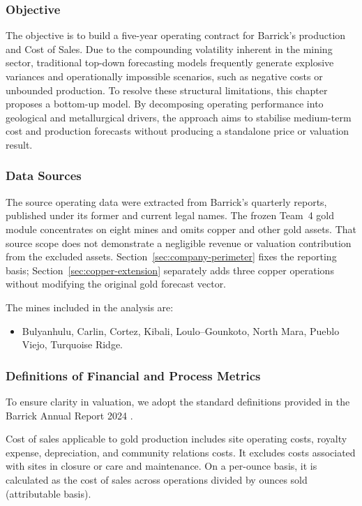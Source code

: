 \subsubsection{Objective}
The objective is to build a five-year operating contract for Barrick's production and Cost of Sales. Due to the compounding volatility inherent in the mining sector, traditional top-down forecasting models frequently generate explosive variances and operationally impossible scenarios, such as negative costs or unbounded production. To resolve these structural limitations, this chapter proposes a bottom-up model. By decomposing operating performance into geological and metallurgical drivers, the approach aims to stabilise medium-term cost and production forecasts without producing a standalone price or valuation result.
\subsubsection{Data Sources}
The source operating data were extracted from Barrick's quarterly reports,
published under its former and current legal names. The frozen Team~4 gold
module concentrates on eight mines and omits copper and other gold assets.
That source scope does not demonstrate a negligible revenue or valuation
contribution from the excluded assets. Section~\ref{sec:company-perimeter}
fixes the reporting basis; Section~\ref{sec:copper-extension} separately adds
three copper operations without modifying the original gold forecast vector.

The mines included in the analysis are:
\begin{itemize}
  \item Bulyanhulu, Carlin, Cortez, Kibali, Loulo--Gounkoto, North Mara, Pueblo Viejo, Turquoise Ridge.
\end{itemize}
\subsubsection{Definitions of Financial and Process Metrics}
To ensure clarity in valuation, we adopt the standard definitions provided in the Barrick Annual Report 2024 .

\begin{definition}
Cost of sales applicable to gold production includes site operating costs, royalty expense, depreciation, and community relations costs. It excludes costs associated with sites in closure or care and maintenance. On a per-ounce basis, it is calculated as the cost of sales across operations divided by ounces sold (attributable basis).
\end{definition}


